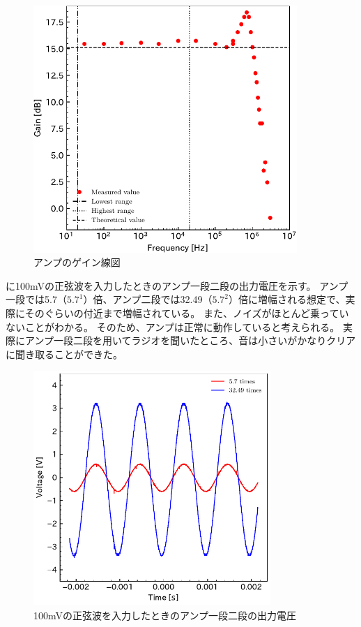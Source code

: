 \documentclass[report.tex]{subfiles}
\begin{document}
\begin{figure}[H]
	\centering
	\includegraphics[width=10cm]{fig/gain.pdf}
	\caption{アンプのゲイン線図}
	\label{fig:gain}
\end{figure}

に100mVの正弦波を入力したときのアンプ一段二段の出力電圧を示す。
アンプ一段では5.7（\(5.7^1\)）倍、アンプ二段では32.49（\(5.7^2\)）倍に増幅される想定で、実際にそのぐらいの付近まで増幅されている。
また、ノイズがほとんど乗っていないことがわかる。
そのため、アンプは正常に動作していると考えられる。
実際にアンプ一段二段を用いてラジオを聞いたところ、音は小さいがかなりクリアに聞き取ることができた。

\begin{figure}[H]
	\centering
	\includegraphics[width=9cm]{fig/level12_100m.pdf}
	\caption{100mVの正弦波を入力したときのアンプ一段二段の出力電圧}
	\label{fig:12_100m}
\end{figure}
\end{document}

